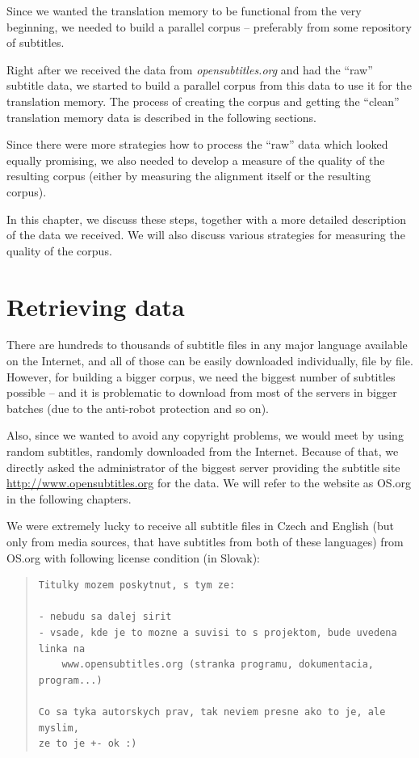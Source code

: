 \label{chap:building_corpus}

Since we wanted the translation memory to be functional from the very beginning, we needed to build a parallel corpus -- preferably from some repository of subtitles.

Right after we received the data from \emph{opensubtitles.org} and had the ``raw'' subtitle data, we started to build a parallel corpus from this data to use it for the translation memory. The process of creating the corpus and getting the ``clean'' translation memory data is described in the following sections.

Since there were more strategies how to process the ``raw'' data which looked equally promising, we also needed to develop a measure of the quality of the resulting corpus (either by measuring the alignment itself or the resulting corpus).

In this chapter, we discuss these steps, together with a more detailed description of the data we received. We will also discuss various strategies for measuring the quality of the corpus.

\section{Retrieving data}

There are hundreds to thousands of subtitle files in any major language available on the Internet, and all of those can be easily downloaded individually, file by file. However, for building a bigger corpus, we need the biggest number of subtitles possible -- and it is problematic to download from most of the servers in bigger batches (due to the anti-robot protection and so on).

Also, since we wanted to avoid any copyright problems, we would meet by using random subtitles, randomly downloaded from the Internet. Because of that, we directly asked the administrator of the biggest server providing the subtitle site \url{http://www.opensubtitles.org} for the data. We will refer to the website as OS.org in the following chapters.

We were extremely lucky to receive all subtitle files in Czech and English (but only from media sources, that have subtitles from both of these languages) from OS.org with following license condition (in Slovak):

\begin{quote}
\begin{verbatim}
Titulky mozem poskytnut, s tym ze:

- nebudu sa dalej sirit
- vsade, kde je to mozne a suvisi to s projektom, bude uvedena linka na
    www.opensubtitles.org (stranka programu, dokumentacia, program...)

Co sa tyka autorskych prav, tak neviem presne ako to je, ale myslim,
ze to je +- ok :)
\end{verbatim}
\end{quote}

